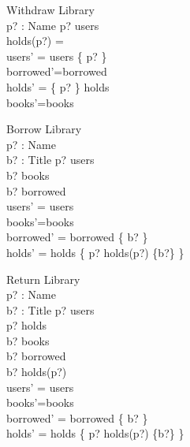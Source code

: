 \begin{schema}{Withdraw}
 \Delta Library \\
 p? : Name 
\where
 p? \in users \\
 holds(p?) = \emptyset\\
 users' = users \setminus \{ p? \} \\
 borrowed'=borrowed\\
 holds' = \{ p? \} \ndres holds\\
 books'=books
\end{schema}

\begin{schema}{Borrow}
 \Delta Library \\
 p? : Name\\
 b? : Title
\where
 p? \in users \\
 b? \in books\\
 b? \notin borrowed\\
 users' = users \\
 books'=books\\
 borrowed' = borrowed \cup \{ b? \} \\
 holds' = holds \oplus \{ p? \mapsto holds(p?) \cup \{b?\} \}
 
\end{schema}

\begin{schema}{Return}
 \Delta Library \\
 p? : Name\\
 b? : Title
\where
 p? \in users \\
 p? \in \dom holds \\
 b? \in books\\
 b? \in borrowed\\
 b? \in holds(p?) \\
 users' = users \\
 books'=books\\
 borrowed' = borrowed \setminus \{ b? \} \\
 holds' = holds \oplus \{ p? \mapsto holds(p?) \setminus \{b?\} \} \\
\end{schema}




